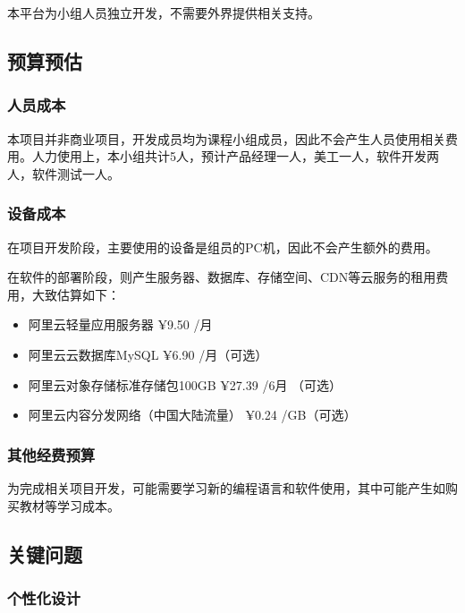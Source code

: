 \documentclass[
]{article}
\begin{document}
本平台为小组人员独立开发，不需要外界提供相关支持。

\hypertarget{header-n3709}{%
\subsection{预算预估}\label{header-n3709}}

\hypertarget{header-n3710}{%
\subsubsection{人员成本}\label{header-n3710}}

本项目并非商业项目，开发成员均为课程小组成员，因此不会产生人员使用相关费用。人力使用上，本小组共计5人，预计产品经理一人，美工一人，软件开发两人，软件测试一人。

\hypertarget{header-n3712}{%
\subsubsection{设备成本}\label{header-n3712}}

在项目开发阶段，主要使用的设备是组员的PC机，因此不会产生额外的费用。

在软件的部署阶段，则产生服务器、数据库、存储空间、CDN等云服务的租用费用，大致估算如下：

\begin{itemize}
\item
  阿里云轻量应用服务器 ¥9.50 /月
\item
  阿里云云数据库MySQL ¥6.90 /月（可选）
\item
  阿里云对象存储标准存储包100GB ¥27.39 /6月 （可选）
\item
  阿里云内容分发网络（中国大陆流量） ¥0.24 /GB（可选）
\end{itemize}

\hypertarget{header-n3724}{%
\subsubsection{其他经费预算}\label{header-n3724}}

为完成相关项目开发，可能需要学习新的编程语言和软件使用，其中可能产生如购买教材等学习成本。

\hypertarget{header-n3726}{%
\subsection{关键问题}\label{header-n3726}}

\hypertarget{header-n3727}{%
\subsubsection{个性化设计}\label{header-n3727}}
\end{document}
